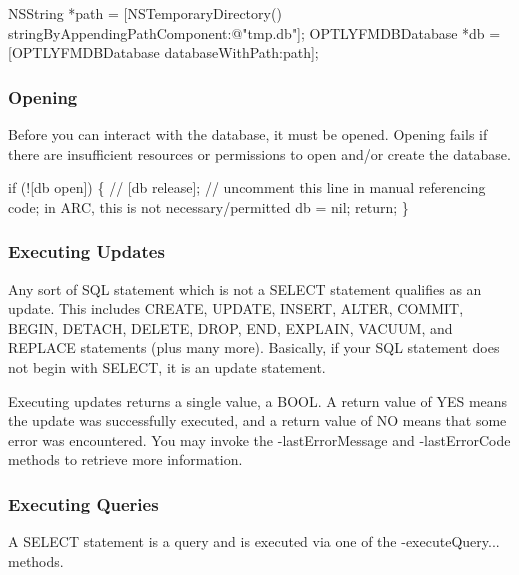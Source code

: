 \begin{DoxyCode}
NSString *path = [NSTemporaryDirectory() stringByAppendingPathComponent:@"tmp.db"];
OPTLYFMDBDatabase *db = [OPTLYFMDBDatabase databaseWithPath:path];
\end{DoxyCode}


\subsubsection*{Opening}

Before you can interact with the database, it must be opened. Opening fails if there are insufficient resources or permissions to open and/or create the database.


\begin{DoxyCode}
if (![db open]) \{
    // [db release];   // uncomment this line in manual referencing code; in ARC, this is not
       necessary/permitted
    db = nil;
    return;
\}
\end{DoxyCode}


\subsubsection*{Executing Updates}

Any sort of S\+QL statement which is not a {\ttfamily S\+E\+L\+E\+CT} statement qualifies as an update. This includes {\ttfamily C\+R\+E\+A\+TE}, {\ttfamily U\+P\+D\+A\+TE}, {\ttfamily I\+N\+S\+E\+RT}, {\ttfamily A\+L\+T\+ER}, {\ttfamily C\+O\+M\+M\+IT}, {\ttfamily B\+E\+G\+IN}, {\ttfamily D\+E\+T\+A\+CH}, {\ttfamily D\+E\+L\+E\+TE}, {\ttfamily D\+R\+OP}, {\ttfamily E\+ND}, {\ttfamily E\+X\+P\+L\+A\+IN}, {\ttfamily V\+A\+C\+U\+UM}, and {\ttfamily R\+E\+P\+L\+A\+CE} statements (plus many more). Basically, if your S\+QL statement does not begin with {\ttfamily S\+E\+L\+E\+CT}, it is an update statement.

Executing updates returns a single value, a {\ttfamily B\+O\+OL}. A return value of {\ttfamily Y\+ES} means the update was successfully executed, and a return value of {\ttfamily NO} means that some error was encountered. You may invoke the {\ttfamily -\/last\+Error\+Message} and {\ttfamily -\/last\+Error\+Code} methods to retrieve more information.

\subsubsection*{Executing Queries}

A {\ttfamily S\+E\+L\+E\+CT} statement is a query and is executed via one of the {\ttfamily -\/execute\+Query...} methods.

